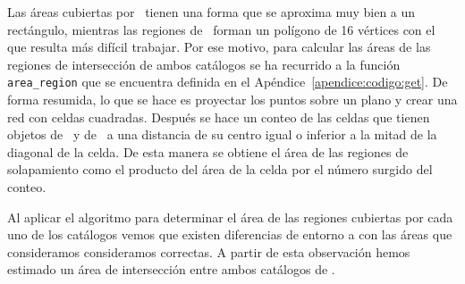 Las áreas cubiertas por \gama\ tienen una forma que se aproxima muy bien a un rectángulo, mientras las regiones de \hatlas\ forman un polígono de 16 vértices con el que resulta más difícil trabajar. Por ese motivo, para calcular las áreas de las regiones de intersección de ambos catálogos se ha recurrido a la función \texttt{area\_region} que se encuentra definida en el Apéndice~\ref{apendice:codigo:get}. De forma resumida, lo que se hace es proyectar los puntos sobre un plano y crear una red con celdas cuadradas. Después se hace un conteo de las celdas que tienen objetos de \gama\ y de \hatlas\ a una distancia de su centro igual o inferior a la mitad de la diagonal de la celda. De esta manera se obtiene el área de las regiones de solapamiento como el producto del área de la celda por el número surgido del conteo.

Al aplicar el algoritmo para determinar el área de las regiones cubiertas por cada uno de los catálogos vemos que existen diferencias de entorno a  con las áreas que consideramos consideramos correctas. A partir de esta observación hemos estimado un área de intersección entre ambos catálogos de .

\newpage

